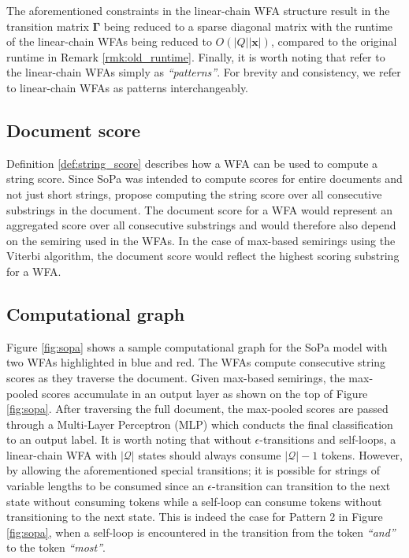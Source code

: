 The aforementioned constraints in the linear-chain WFA structure result in the
transition matrix $\bm{\Gamma}$ being reduced to a sparse diagonal matrix with the
runtime of the linear-chain WFAs being reduced to $O(|Q||\bm{x}|)$, compared to
the original runtime in Remark \ref{rmk:old_runtime}. Finally, it is worth
noting that \citet[Page 3, Section 3.1]{schwartz2018sopa} refer to the
linear-chain WFAs simply as \textit{``patterns''}. For brevity and consistency,
we refer to linear-chain WFAs as patterns interchangeably.

\subsection{Document score}

Definition \ref{def:string_score}
describes how a WFA can be used to compute a string score. Since SoPa was
intended to compute scores for entire documents and not just short strings,
\citet{schwartz2018sopa} propose computing the string score over all consecutive
substrings in the document. The document score for a WFA would represent an
aggregated score over all consecutive substrings and would therefore also depend
on the semiring used in the WFAs. In the case of max-based semirings using the
Viterbi algorithm, the document score would reflect the highest scoring
substring for a WFA.

\subsection{Computational graph}

\label{section:sopa_cg}

Figure \ref{fig:sopa} shows a sample
computational graph for the SoPa model with two WFAs highlighted in blue and
red. The WFAs compute consecutive string scores as they traverse the document.
Given max-based semirings, the max-pooled scores accumulate in an output layer
as shown on the top of Figure \ref{fig:sopa}. After traversing the full
document, the max-pooled scores are passed through a Multi-Layer Perceptron
(MLP) which conducts the final classification to an output label. It is worth
noting that without $\epsilon$-transitions and self-loops, a linear-chain WFA
with $|\mathcal{Q}|$ states should always consume $\mathcal{|Q|}-1$ tokens.
However, by allowing the aforementioned special transitions; it is possible for
strings of variable lengths to be consumed since an $\epsilon$-transition can
transition to the next state without consuming tokens while a self-loop can
consume tokens without transitioning to the next state. This is indeed the case
for Pattern 2 in Figure \ref{fig:sopa}, when a self-loop is encountered in the
transition from the token \textit{``and''} to the token \textit{``most''}.

